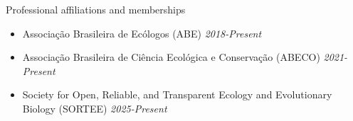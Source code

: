 \documentclass{resume}
\begin{document}
\begin{rSection}{Professional affiliations and memberships}
\begin{itemize}
\item Associação Brasileira de Ecólogos (ABE) \hfill{\em 2018-Present}
\item Associação Brasileira de Ciência Ecológica e Conservação (ABECO) \hfill{\em 2021-Present}
\item Society for Open, Reliable, and Transparent Ecology and Evolutionary Biology (SORTEE) \hfill{\em 2025-Present}
\end{itemize}
\end{rSection}

\end{document}
